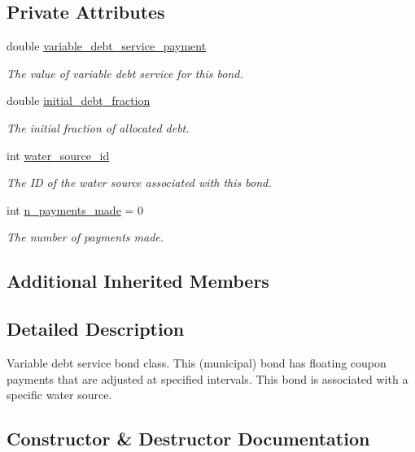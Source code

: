 \subsection*{Private Attributes}
\begin{DoxyCompactItemize}
\item 
double \mbox{\hyperlink{classVariableDebtServiceBond_af8e932fd3253dd365ee31605fc9d5487}{variable\+\_\+debt\+\_\+service\+\_\+payment}}
\begin{DoxyCompactList}\small\item\em The value of variable debt service for this bond. \end{DoxyCompactList}\item 
double \mbox{\hyperlink{classVariableDebtServiceBond_abd86106a72ef0eaaa158aeefcad335b3}{initial\+\_\+debt\+\_\+fraction}}
\begin{DoxyCompactList}\small\item\em The initial fraction of allocated debt. \end{DoxyCompactList}\item 
int \mbox{\hyperlink{classVariableDebtServiceBond_aeb29dad91171f6ad6c4a7d8b8dda55cd}{water\+\_\+source\+\_\+id}}
\begin{DoxyCompactList}\small\item\em The ID of the water source associated with this bond. \end{DoxyCompactList}\item 
int \mbox{\hyperlink{classVariableDebtServiceBond_a04fd4837badb2e299e2718fefd9472c5}{n\+\_\+payments\+\_\+made}} = 0
\begin{DoxyCompactList}\small\item\em The number of payments made. \end{DoxyCompactList}\end{DoxyCompactItemize}
\subsection*{Additional Inherited Members}


\subsection{Detailed Description}
Variable debt service bond class. This (municipal) bond has floating coupon payments that are adjusted at specified intervals. This bond is associated with a specific water source. 

\subsection{Constructor \& Destructor Documentation}
\mbox{\label{classVariableDebtServiceBond_a8259b64265dd9701ac5888e0fe0bc565}} 
